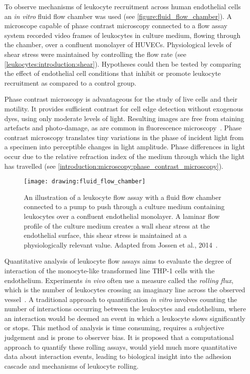 To observe mechanisms of leukocyte recruitment across human endothelial cells an \emph{in vitro} fluid flow chamber was used (see \autoref{figure:fluid_flow_chamber}). A microscope capable of phase contrast microscopy connected to a flow assay system recorded video frames of leukocytes in culture medium, flowing through the chamber, over a confluent monolayer of HUVECs. Physiological levels of shear stress were maintained by controlling the flow rate (see \autoref{leukocytes:introduction:shear}). Hypotheses could then be tested by comparing the effect of endothelial cell conditions that inhibit or promote leukocyte recruitment as compared to a control group.

Phase contrast microscopy is advantageous for the study of live cells and their motility. It provides sufficient contrast for cell edge detection without exogenous dyes, using only moderate levels of light. Resulting images are free from staining artefacts and photo-damage, as are common in fluorescence microscopy~\cite{Ambuhl2012}. Phase contrast microscopy translates tiny variations in the phase of incident light from a specimen into perceptible changes in light amplitude. Phase differences in light occur due to the relative refraction index of the medium through which the light has travelled (see \autoref{introduction:microscopy:phase_contrast_microscopy}).

\begin{figure}[htbp!]
	\centering
	\texttt{[image: drawing:fluid\_flow\_chamber]}
	\caption[Fluid flow chamber]{An illustration of a leukocyte flow assay with a fluid flow chamber connected to a pump to push through a culture medium containing leukocytes over a confluent endothelial monolayer. A laminar flow profile of the culture medium creates a wall shear stress at the endothelial surface, this shear stress is maintained at a physiologically relevant value. Adapted from Jossen et al., 2014~\cite{Jossen2014}.}
	\label{figure:fluid_flow_chamber}
\end{figure}

Quantitative analysis of leukocyte flow assays aims to evaluate the degree of interaction of the monocyte-like transformed line THP-1 cells with the endothelium. Experiments \emph{in vivo} often use a measure called the \emph{rolling flux}, which is the number of leukocytes crossing an imaginary line across the observed vessel~\cite{Sperandio2006}. A traditional approach to quantification \emph{in vitro} involves counting the number of interactions occurring between the leukocytes and endothelium, where an interaction would be deemed an event in which a leukocyte slows significantly or stops. This method of analysis is time consuming, requires a subjective judgement and is prone to observer bias. It is proposed that a computational approach to quantify these rolling assays, would yield much more quantitative data about interaction events, leading to biological insight into the adhesion cascade and mechanisms of leukocyte rolling.


